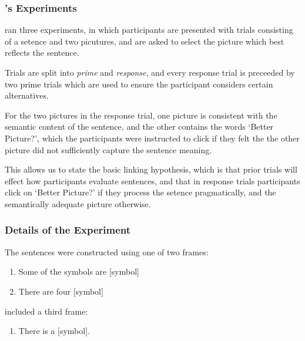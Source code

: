 \documentclass[noamssymb]{beamer}
\begin{document}
\begin{frame}
  \frametitle{{\ftf \citeauthor{Bott:2016aa}'s Experiments}}
  \citeauthor{Bott:2016aa} ran three experiments, in which participants are presented with trials consisting of a setence and two picutures, and are asked to select the picture which best reflects the sentence.

  Trials are split into \emph{prime} and \emph{response}, and every response trial is preceeded by two prime trials which are used to ensure the participant considers certain alternatives.

  For the two pictures in the response trial, one picture is consistent with the semantic content of the sentence, and the other contains the words `Better Picture?', which the participants were instructed to click if they felt the the other picture did not sufficiently capture the sentence meaning.

  This allows us to state the basic linking hypothesis, which is that prior trials will effect how participants evaluate sentences, and that in response trials participants click on `Better Picture?' if they process the setence pragmatically, and the semantically adequate picture otherwise.
\end{frame}

\begin{frame}
  \frametitle{{\ftf Details of the Experiment}}

The sentences were constructed using one of two frames:
\begin{enumerate}[label=(\roman*)]
\item Some of the symbols are [symbol]
\item There are four [symbol]
\end{enumerate}

\citeauthor{Bott:2016aa} included a third frame:
\begin{enumerate}[label=(\roman*), resume]
\item There is a [symbol].
\end{enumerate}
\end{frame}
\end{document}
